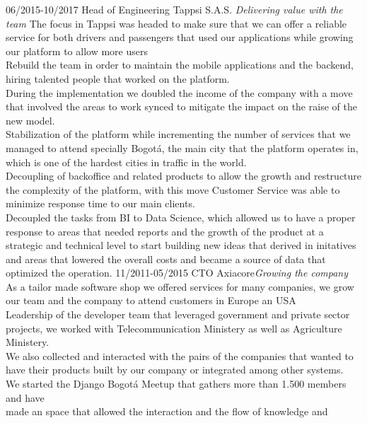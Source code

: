   \begin{entrylist}
  \entry
    {06/2015-10/2017}
    {Head of Engineering}
    {Tappsi S.A.S. {\sl Delivering value with the team}}
    {The focus in Tappsi was headed to make sure that we can offer a reliable service for
    both drivers and passengers that used our applications while growing our platform
    to allow more users\\Rebuild the team in order to maintain the mobile applications 
    and the backend, hiring talented people that worked on the platform.\\During the 
    implementation we doubled the income of the company with a move that involved the 
    areas to work synced to mitigate the impact on the raise of the new model.\\ Stabilization 
    of the platform while incrementing the number of services that we managed to attend 
    specially Bogotá, the main city that the platform operates in, which is one of the 
    hardest cities in traffic in the world. \\ Decoupling of backoffice and related 
    products to allow the growth and restructure the complexity of the platform, with 
    this move Customer Service was able to minimize response time to our main clients.
    \\Decoupled the tasks from BI to Data Science, which allowed us to have a proper 
    response to areas that needed reports and the growth of the product at a strategic 
    and technical level to start building new ideas that derived in initatives and areas 
    that lowered the overall costs and became a source of data that optimized the operation.}
  \entry
    {11/2011-05/2015}
    {CTO}
    {Axiacore{\sl Growing the company}}
    {As a tailor made software shop we offered services for many companies, we grow
    our team and the company to attend customers in Europe an USA\\ Leadership of the
    developer team that leveraged government and private sector projects, we worked
    with Telecommunication Ministery as well as Agriculture Ministery. \\ We also 
    collected and interacted with the pairs of the companies that wanted to have 
    their products built by our company or integrated among other systems. \\  We 
    started the Django Bogotá Meetup that gathers more than 1.500 members and have\\
    made an space that allowed the interaction and the flow of knowledge and 
}
\end{entrylist}
